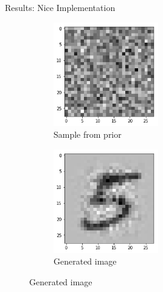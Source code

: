 \begin{frame}{Results: Nice Implementation}
\begin{figure}[htbp!]
     \hfill
\end{figure}
    \begin{figure}[htbp!]
     \centering
     \begin{subfigure}[b]{0.45\textwidth}
         \centering
         \includegraphics[width=0.5\textwidth]{Images/sample.png}
         \caption{Sample from prior}
     \end{subfigure} 
     \hfill
     \begin{subfigure}[b]{0.45\textwidth}
         \centering
         \includegraphics[width=0.5\textwidth]{Images/generated.png}
         \caption{Generated image}
     \end{subfigure}
     \hfill
\end{figure}
\end{frame}
